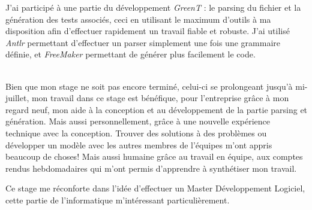 \documentclass[a4paper, 12pt]{article}
\begin{document}
	J'ai participé à une partie du développement \textit{GreenT} : le parsing du fichier et la génération des tests associés, ceci en utilisant le maximum d'outils à ma
	disposition afin d'effectuer rapidement un travail fiable et robuste. J'ai utilisé \textit{Antlr} permettant d'effectuer un parser simplement une fois
	une grammaire définie, et \textit{FreeMaker} permettant de générer plus facilement le code.\\~

	Bien que mon stage ne soit pas encore terminé, celui-ci se prolongeant jusqu'à mi-juillet, mon travail dans ce stage est bénéfique, pour l'entreprise grâce à
	mon regard neuf, mon aide à la conception et au développement de la partie parsing et génération. Mais aussi personnellement, grâce à une nouvelle expérience
	technique avec la conception. Trouver des solutions à des problèmes ou développer un modèle avec les autres membres de l'équipes m'ont appris beaucoup de
	choses! Mais aussi humaine grâce au travail en équipe, aux comptes rendus hebdomadaires qui m'ont permis d'apprendre à synthétiser mon travail.

	Ce stage me réconforte dans l'idée d'effectuer un Master Développement Logiciel, cette partie de l'informatique m'intéressant particulièrement.
\end{document}
